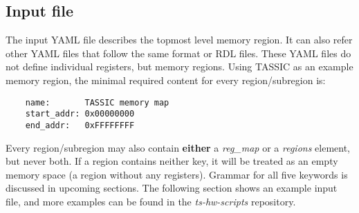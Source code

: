 \documentclass{tropic_design_spec}
\begin{document}
\subsection{Input file}
The input YAML file describes the topmost level memory region. It can also refer other YAML
files that follow the same format or RDL files. These YAML files do not define individual 
registers, but memory regions. Using TASSIC as an example memory region, the minimal
required content for every region/subregion is:
\begin{lstlisting}
    name:       TASSIC memory map
    start_addr: 0x00000000
    end_addr:   0xFFFFFFFF
\end{lstlisting}
Every region/subregion may also contain \textbf{either} a \textit{reg_map} or a 
\textit{regions} element, but never both. If a region contains neither key, it 
will be treated as an empty memory space (a region without any registers).
Grammar for all five keywords is discussed in upcoming sections.
\newline
The following section shows an example input file, and more examples can be found in the
\textit{ts-hw-scripts} repository.
\pagebreak
\end{document}
